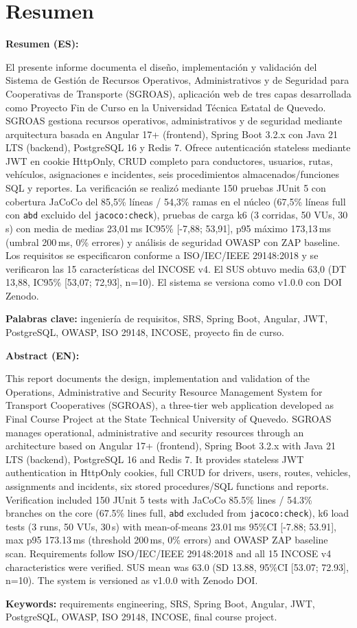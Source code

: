 \chapter*{Resumen}

\textbf{Resumen (ES):}

El presente informe documenta el diseño, implementación y validación del Sistema de Gestión de Recursos Operativos, Administrativos y de Seguridad para Cooperativas de Transporte (SGROAS), aplicación web de tres capas desarrollada como Proyecto Fin de Curso en la Universidad Técnica Estatal de Quevedo. SGROAS gestiona recursos operativos, administrativos y de seguridad mediante arquitectura basada en Angular 17+ (frontend), Spring Boot 3.2.x con Java 21 LTS (backend), PostgreSQL 16 y Redis 7. Ofrece autenticación stateless mediante JWT en cookie HttpOnly, CRUD completo para conductores, usuarios, rutas, vehículos, asignaciones e incidentes, seis procedimientos almacenados/funciones SQL y reportes. La verificación se realizó mediante 150 pruebas JUnit 5 con cobertura JaCoCo del 85,5\% líneas / 54,3\% ramas en el núcleo (67,5\% líneas full con \texttt{abd} excluido del \texttt{jacoco:check}), pruebas de carga k6 (3 corridas, 50 VUs, 30\,s) con media de medias 23,01\,ms IC95\% [-7,88; 53,91], p95 máximo 173,13\,ms (umbral 200\,ms, 0\% errores) y análisis de seguridad OWASP con ZAP baseline. Los requisitos se especificaron conforme a ISO/IEC/IEEE 29148:2018 y se verificaron las 15 características del INCOSE v4. El SUS obtuvo media 63,0 (DT 13,88, IC95\% [53,07; 72,93], n=10). El sistema se versiona como v1.0.0 con DOI Zenodo.

\textbf{Palabras clave:} ingeniería de requisitos, SRS, Spring Boot, Angular, JWT, PostgreSQL, OWASP, ISO 29148, INCOSE, proyecto fin de curso.

\medskip

\textbf{Abstract (EN):}

This report documents the design, implementation and validation of the Operations, Administrative and Security Resource Management System for Transport Cooperatives (SGROAS), a three-tier web application developed as Final Course Project at the State Technical University of Quevedo. SGROAS manages operational, administrative and security resources through an architecture based on Angular 17+ (frontend), Spring Boot 3.2.x with Java 21 LTS (backend), PostgreSQL 16 and Redis 7. It provides stateless JWT authentication in HttpOnly cookies, full CRUD for drivers, users, routes, vehicles, assignments and incidents, six stored procedures/SQL functions and reports. Verification included 150 JUnit 5 tests with JaCoCo 85.5\% lines / 54.3\% branches on the core (67.5\% lines full, \texttt{abd} excluded from \texttt{jacoco:check}), k6 load tests (3 runs, 50 VUs, 30\,s) with mean-of-means 23.01\,ms 95\%CI [-7.88; 53.91], max p95 173.13\,ms (threshold 200\,ms, 0\% errors) and OWASP ZAP baseline scan. Requirements follow ISO/IEC/IEEE 29148:2018 and all 15 INCOSE v4 characteristics were verified. SUS mean was 63.0 (SD 13.88, 95\%CI [53.07; 72.93], n=10). The system is versioned as v1.0.0 with Zenodo DOI.

\textbf{Keywords:} requirements engineering, SRS, Spring Boot, Angular, JWT, PostgreSQL, OWASP, ISO 29148, INCOSE, final course project.
